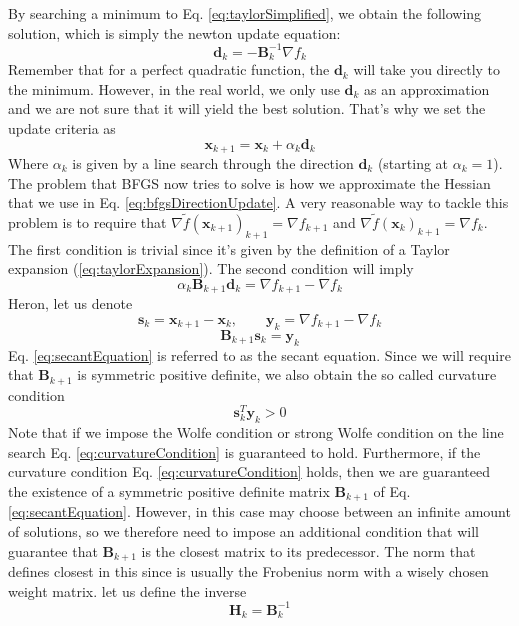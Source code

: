 \documentclass[a4paper,10pt]{article}
\theoremstyle{definition}
\begin{document}
By searching a minimum to Eq. \ref{eq:taylorSimplified}, we obtain the following solution, which is simply the newton update equation:
\begin{equation}
	\pmb{d}_{k} = -\pmb{B}_k^{-1}\nabla f_k
	\label{eq:bfgsDirectionUpdate}
\end{equation}
Remember that for a perfect quadratic function, the $\pmb{d}_k$ will take you directly to the minimum. However, in the real world, we only use $\pmb{d}_k$ as an approximation and we are not sure that it will yield the best solution. That's why we set the update criteria as 
\begin{equation}
	\pmb{x}_{k+1} = \pmb{x}_k + \alpha_k \pmb{d}_k
	\label{eq:updateBFGS}
\end{equation}
Where $\alpha_k$ is given by a line search through the direction $\pmb{d}_k$ (starting at $\alpha_k = 1$). The problem that BFGS now tries to solve is how we approximate the Hessian that we use in Eq. \ref{eq:bfgsDirectionUpdate}. A very reasonable way to tackle this problem is to require that $\nabla \tilde{f}(\pmb{x}_{k+1})_{k + 1} = \nabla f_{k+1}$ and $\nabla \tilde{f}(\pmb{x}_{k})_{k + 1} = \nabla f_{k}$. The first condition is trivial since it's given by the definition of a Taylor expansion (\ref{eq:taylorExpansion}). The second condition will imply
\begin{equation}
	\alpha_{k}\pmb{B}_{k+1}\pmb{d}_k = \nabla f_{k+1} - \nabla f_k
\end{equation}
Heron, let us denote
\begin{equation}
	\pmb{s}_k = \pmb{x}_{k+1} - \pmb{x}_k, \qquad \pmb{y}_k = \nabla f_{k+1} - \nabla f_{k}
\end{equation}
\begin{equation}
	\pmb{B}_{k+1} \pmb{s}_k = \pmb{y}_k
	\label{eq:secantEquation}
\end{equation}
Eq. \ref{eq:secantEquation} is referred to as the secant equation. Since we will require that $\pmb{B}_{k+1}$ is symmetric positive definite, we also obtain the so called curvature condition
\begin{equation}
	\pmb{s}_k^T\pmb{y}_k > 0
	\label{eq:curvatureCondition}
\end{equation}
Note that if we impose the Wolfe condition or strong Wolfe condition on the line search Eq. \ref{eq:curvatureCondition} is guaranteed to hold. Furthermore, if the curvature condition Eq. \ref{eq:curvatureCondition} holds, then we are guaranteed the existence of a symmetric positive definite matrix $\pmb{B}_{k+1}$ of Eq. \ref{eq:secantEquation}. However, in this case may choose between an infinite amount of solutions, so we therefore need to impose an additional condition that will guarantee that $\pmb{B}_{k+1}$ is the closest matrix to its predecessor. The norm that defines closest in this since is usually the Frobenius norm with a wisely chosen weight matrix. let us define the inverse
\begin{equation}
	\pmb{H}_{k} = \pmb{B}^{-1}_k
\end{equation}
\end{document}
